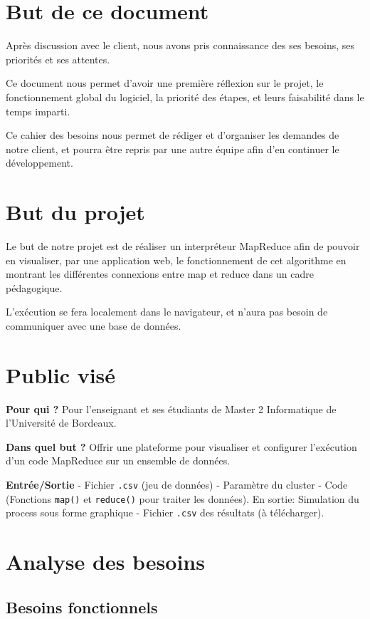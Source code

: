 \documentclass[12pt,a4paper]{article}
\begin{document}
\section{But de ce document}

Après discussion avec le client, nous avons pris connaissance des ses
besoins, ses priorités et ses attentes. 

Ce document nous permet d'avoir
une première réflexion sur le projet, le fonctionnement global du
logiciel, la priorité des étapes, et leurs faisabilité dans le temps
imparti. 

Ce cahier des besoins nous permet de rédiger et d'organiser les
demandes de notre client, et pourra être repris par une autre équipe afin
d'en continuer le développement.
\section{But du projet}\label{but-du-projet}

Le but de notre projet est de réaliser un interpréteur MapReduce \cite{Google} afin de
pouvoir en visualiser, par une application web, le fonctionnement de cet algorithme en montrant les différentes connexions entre map et reduce dans un cadre pédagogique.

L'exécution se fera localement dans le navigateur, et n'aura pas besoin de communiquer avec une base de données.
\section{Public visé}

\textbf{Pour qui ?} Pour l'enseignant et ses étudiants de Master 2 Informatique de l'Université de Bordeaux.

\textbf{Dans quel but ?} Offrir une plateforme pour visualiser et configurer l'exécution d'un code MapReduce sur un ensemble de données. 

\textbf{Entrée/Sortie} - Fichier \texttt{.csv} (jeu de données) - Paramètre du cluster - Code (Fonctions \texttt{map()} et \texttt{reduce()} pour traiter les données). En sortie: Simulation du process sous forme graphique - Fichier \texttt{.csv} des résultats (à télécharger).

\newpage
\section{Analyse des besoins}
\subsection{Besoins fonctionnels}
\end{document}
